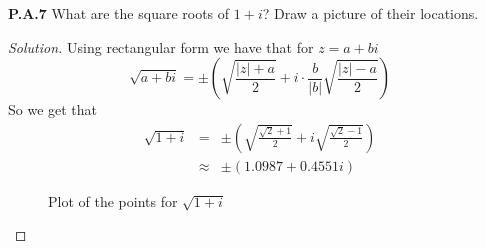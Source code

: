\documentclass[12pt]{amsart}
\newenvironment{solution}
{\begin{proof}[Solution]}
{\end{proof}}
\begin{document}
\begin{onehalfspace}
        \noindent\textbf{P.A.7} What are the square roots of $1 + i$? Draw a picture of their locations.
        \begin{solution}
            Using rectangular form we have that for $z = a+bi$
            \begin{displaymath}
                \sqrt{a+bi} = \pm \left(\sqrt{\frac{|z| + a}{2}} + i \cdot \frac{b}{|b|}\sqrt{\frac{|z| - a}{2}}\right)
            \end{displaymath}
            So we get that
            \begin{eqnarray*}
                \sqrt{1 + i} & = & \pm \left(\sqrt{\frac{\sqrt{2} + 1}{2}} + i \sqrt{\frac{\sqrt{2} - 1}{2}}\right) \\
                             & \approx & \pm (1.0987 + 0.4551i)
            \end{eqnarray*}
            \begin{figure}[!ht]
                \centering
                \caption{Plot of the points for $\sqrt{1 + i}$ }
            \end{figure}
        \end{solution}


\end{onehalfspace}
\end{document}
